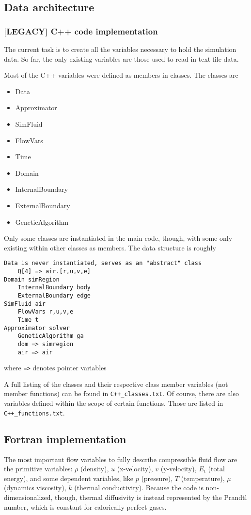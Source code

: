 \documentclass[12pt]{article}
\begin{document}
    \subsection{Data architecture}
    \subsubsection*{[LEGACY] C++ code implementation}
        The current task is to create all the variables necessary to hold the simulation data. So far, the only existing variables are those used to read in text file data.
            
        Most of the C++ variables were defined as members in classes. The classes are
        \begin{multicols}{3}
            \begin{itemize}
                \item Data
                \item Approximator
                \item SimFluid
                \item FlowVars
                \item Time
                \item Domain
                \item InternalBoundary
                \item ExternalBoundary
                \item GeneticAlgorithm
            \end{itemize}
        \end{multicols}
        Only some classes are instantiated in the main code, though, with some only existing within other classes as members. The data structure is roughly
        \begin{verbatim}
Data is never instantiated, serves as an "abstract" class
    Q[4] => air.[r,u,v,e]
Domain simRegion
    InternalBoundary body
    ExternalBoundary edge
SimFluid air
    FlowVars r,u,v,e
    Time t
Approximator solver
    GeneticAlgorithm ga
    dom => simregion
    air => air
        \end{verbatim}
        where \texttt{=>} denotes pointer variables

        A full listing of the classes and their respective class member variables (not member functions) can be found in \texttt{C++\_classes.txt}. Of course, there are also variables defined within the scope of certain functions. Those are listed in \texttt{C++\_functions.txt}.
    \subsection*{Fortran implementation}
    The most important flow variables to fully describe compressible fluid flow are the primitive variables: $\rho$ (density), $u$ (x-velocity), $v$ (y-velocity), $E_t$ (total energy), and some dependent variables, like $p$ (pressure), $T$ (temperature), $\mu$ (dynamics viscosity), $k$ (thermal conductivity). Because the code is non-dimensionalized, though, thermal diffusivity is instead represented by the Prandtl number, which is constant for calorically perfect gases.
\end{document}
